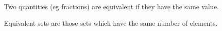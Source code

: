 Two quantities (eg fractions) are equivalent if they have the same value.
\par
Equivalent sets are those sets which have the same number of elements.
